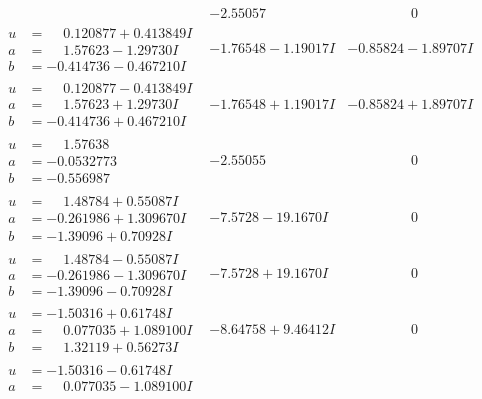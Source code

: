 \documentclass[1p]{elsarticle_modified}
\theoremstyle{definition}
\begin{document}
$$\begin{array}{c|c|c}
 & -2.55057\phantom{ +0.000000I} & \phantom{-0.000000 } 0 \\ \hline\begin{aligned}
u &= \phantom{-}0.120877 + 0.413849 I \\
a &= \phantom{-}1.57623 - 1.29730 I \\
b &= -0.414736 - 0.467210 I\end{aligned}
 & -1.76548 - 1.19017 I & -0.85824 - 1.89707 I \\ \hline\begin{aligned}
u &= \phantom{-}0.120877 - 0.413849 I \\
a &= \phantom{-}1.57623 + 1.29730 I \\
b &= -0.414736 + 0.467210 I\end{aligned}
 & -1.76548 + 1.19017 I & -0.85824 + 1.89707 I \\ \hline\begin{aligned}
u &= \phantom{-}1.57638\phantom{ +0.000000I} \\
a &= -0.0532773\phantom{ +0.000000I} \\
b &= -0.556987\phantom{ +0.000000I}\end{aligned}
 & -2.55055\phantom{ +0.000000I} & \phantom{-0.000000 } 0 \\ \hline\begin{aligned}
u &= \phantom{-}1.48784 + 0.55087 I \\
a &= -0.261986 + 1.309670 I \\
b &= -1.39096 + 0.70928 I\end{aligned}
 & -7.5728 - 19.1670 I & \phantom{-0.000000 } 0 \\ \hline\begin{aligned}
u &= \phantom{-}1.48784 - 0.55087 I \\
a &= -0.261986 - 1.309670 I \\
b &= -1.39096 - 0.70928 I\end{aligned}
 & -7.5728 + 19.1670 I & \phantom{-0.000000 } 0 \\ \hline\begin{aligned}
u &= -1.50316 + 0.61748 I \\
a &= \phantom{-}0.077035 + 1.089100 I \\
b &= \phantom{-}1.32119 + 0.56273 I\end{aligned}
 & -8.64758 + 9.46412 I & \phantom{-0.000000 } 0 \\ \hline\begin{aligned}
u &= -1.50316 - 0.61748 I \\
a &= \phantom{-}0.077035 - 1.089100 I \\

\end{aligned}
\end{array}$$
\end{document}
